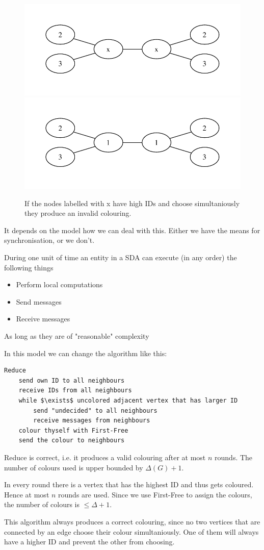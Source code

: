 \begin{figure}
\includegraphics[width=0.5\linewidth]{./images/graph1}
\includegraphics[width=0.5\linewidth]{./images/graph11}
\caption{If the nodes labelled with x have high IDs and choose simultaniously they produce an invalid colouring.}
%
\end{figure}

It depends on the model how we can deal with this. Either we have the means for synchronisation, or we don't.

\begin{Def} During one unit of time an entity in a SDA can execute (in any order) the following things
\begin{itemize}
\item Perform local computations
\item Send messages
\item Receive messages
\end{itemize}

As long as they are of "reasonable" complexity
\end{Def}

In this model we can change the algorithm like this:

\begin{lstlisting}
Reduce
	send own ID to all neighbours
	receive IDs from all neighbours
	while $\exists$ uncolored adjacent vertex that has larger ID
		send "undecided" to all neighbours
		receive messages from neighbours
	colour thyself with First-Free
	send the colour to neighbours
\end{lstlisting}

\begin{thm} Reduce is correct, i.e. it produces a valid colouring after at most $n$ rounds. The number of colours used is upper bounded by $\Delta(G)+1$. 
\end{thm}

\begin{pr} In every round there is a vertex that has the highest ID and thus gets coloured. Hence at most $n$ rounds are used. Since we use First-Free to assign the colours, the number of colours is $\leq \Delta+1$.

This algorithm always produces a correct colouring, since no two vertices that are connected by an edge choose their colour simultaniously. One of them will always have a higher ID and prevent the other from choosing.
\end{pr}
